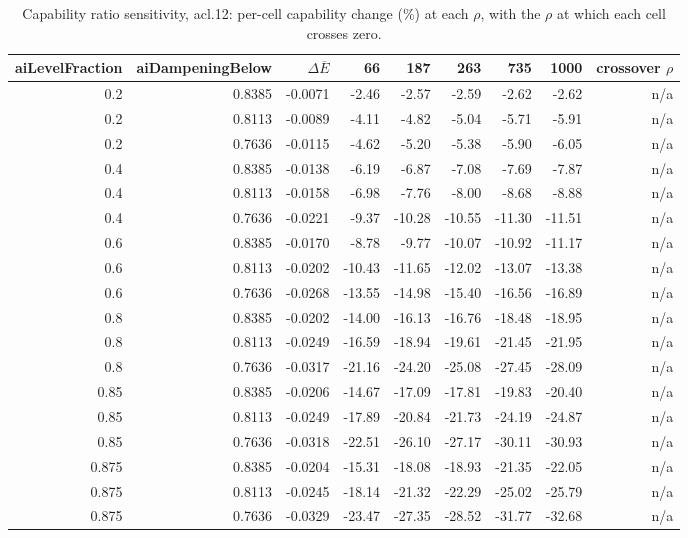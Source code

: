 \begin{table}[htbp]
  \centering
  \caption{Capability ratio sensitivity, acl.12: per-cell capability change (\%) at each $\rho$, with the $\rho$ at which each cell crosses zero.}
  \label{tab:rho-acl-12-cells}
  \begin{tabular}{r r r r r r r r r}
    \toprule
    aiLevelFraction & aiDampeningBelow & $\Delta\overline{E}$ & 66 & 187 & 263 & 735 & 1000 & crossover $\rho$ \\
    \midrule
    0.2 & 0.8385 & -0.0071 & -2.46 & -2.57 & -2.59 & -2.62 & -2.62 & n/a \\
    0.2 & 0.8113 & -0.0089 & -4.11 & -4.82 & -5.04 & -5.71 & -5.91 & n/a \\
    0.2 & 0.7636 & -0.0115 & -4.62 & -5.20 & -5.38 & -5.90 & -6.05 & n/a \\
    0.4 & 0.8385 & -0.0138 & -6.19 & -6.87 & -7.08 & -7.69 & -7.87 & n/a \\
    0.4 & 0.8113 & -0.0158 & -6.98 & -7.76 & -8.00 & -8.68 & -8.88 & n/a \\
    0.4 & 0.7636 & -0.0221 & -9.37 & -10.28 & -10.55 & -11.30 & -11.51 & n/a \\
    0.6 & 0.8385 & -0.0170 & -8.78 & -9.77 & -10.07 & -10.92 & -11.17 & n/a \\
    0.6 & 0.8113 & -0.0202 & -10.43 & -11.65 & -12.02 & -13.07 & -13.38 & n/a \\
    0.6 & 0.7636 & -0.0268 & -13.55 & -14.98 & -15.40 & -16.56 & -16.89 & n/a \\
    0.8 & 0.8385 & -0.0202 & -14.00 & -16.13 & -16.76 & -18.48 & -18.95 & n/a \\
    0.8 & 0.8113 & -0.0249 & -16.59 & -18.94 & -19.61 & -21.45 & -21.95 & n/a \\
    0.8 & 0.7636 & -0.0317 & -21.16 & -24.20 & -25.08 & -27.45 & -28.09 & n/a \\
    0.85 & 0.8385 & -0.0206 & -14.67 & -17.09 & -17.81 & -19.83 & -20.40 & n/a \\
    0.85 & 0.8113 & -0.0249 & -17.89 & -20.84 & -21.73 & -24.19 & -24.87 & n/a \\
    0.85 & 0.7636 & -0.0318 & -22.51 & -26.10 & -27.17 & -30.11 & -30.93 & n/a \\
    0.875 & 0.8385 & -0.0204 & -15.31 & -18.08 & -18.93 & -21.35 & -22.05 & n/a \\
    0.875 & 0.8113 & -0.0245 & -18.14 & -21.32 & -22.29 & -25.02 & -25.79 & n/a \\
    0.875 & 0.7636 & -0.0329 & -23.47 & -27.35 & -28.52 & -31.77 & -32.68 & n/a \\
    \bottomrule
  \end{tabular}
\end{table}
